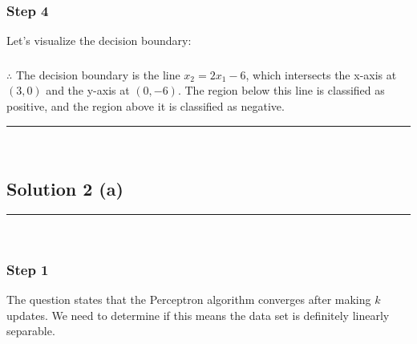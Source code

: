 \documentclass{article}
\begin{document}
\subsubsection*{Step 4}
\parbox{\textwidth}{
Let's visualize the decision boundary:
}

\begin{center}
\end{center}

\subsubsection*{\normalfont}{$\therefore$ The decision boundary is the line $x_2 = 2x_1 - 6$, which intersects the x-axis at $(3,0)$ and the y-axis at $(0,-6)$. The region below this line is classified as positive, and the region above it is classified as negative.}

\noindent\rule{\textwidth}{0.4pt}\\

\newpage

\subsection*{Solution 2 (a)}
\noindent\rule{\textwidth}{0.4pt}\\

\subsubsection*{Step 1}
\parbox{\textwidth}{
The question states that the Perceptron algorithm converges after making $k$ updates. We need to determine if this means the data set is definitely linearly separable.
}
\end{document}
